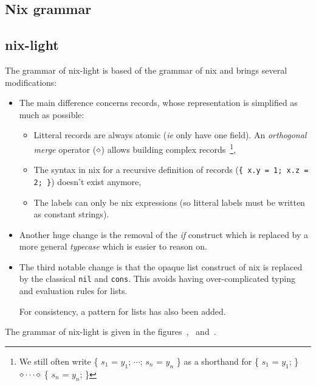 \subsection{Nix grammar}
\label{sec:nix-grammar}


\subsection{nix-light}
\label{sec:nix-light-grammar}

The grammar of nix-light is based of the grammar of nix and brings several
modifications:
\begin{itemize}
  \item The main difference concerns records, whose representation is simplified as
    much as possible:

    \begin{itemize}
      \item Litteral records are always atomic (\emph{ie} only have one field). An
        \emph{orthogonal merge} operator ($\diamond$) allows building complex
        records~\footnote{We still often write \{ $s_1$ = $y_1$; $\cdots{}$;
        $s_n$ = $y_n$ \} as a shorthand for \{ $s_1$ = $y_1$; \} $\diamond
        \cdots{} \diamond$ \{ $s_n$ = $y_n$; \}},

      \item The syntax in nix for a recursive definition of records (\texttt{\{ x.y
        = 1; x.z = 2; \}}) doesn't exist anymore,

      \item The labels can only be nix expressions (so litteral labels must be
        written as constant strings).
    \end{itemize}

  \item Another huge change is the removal of the \emph{if} construct which is
    replaced by a more general \emph{typecase} which is easier to reason on.

  \item The third notable change is that the opaque list construct of nix is
    replaced by the classical \texttt{nil} and \texttt{cons}.
    This avoids having over-complicated typing and evaluation rules for lists.

    For consistency, a pattern for lists has also been added.
\end{itemize}

The grammar of nix-light is given in the
figures~,~
and~.

